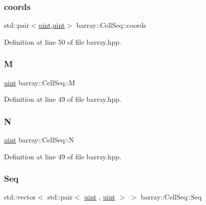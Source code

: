 \subsubsection{\texorpdfstring{coords}{coords}}
{\footnotesize\ttfamily std\+::pair$<$\hyperlink{namespacebarray_af9756a31953db233f80a9cfe1ef31c32}{uint},\hyperlink{namespacebarray_af9756a31953db233f80a9cfe1ef31c32}{uint}$>$ barray\+::\+Cell\+Seq\+::coords\hspace{0.3cm}{\ttfamily [protected]}}



Definition at line 50 of file barray.\+hpp.

\mbox{\label{classbarray_1_1_cell_seq_a4af3a2d3555d9fa5d73ba2b4d60f0806}} 
\subsubsection{\texorpdfstring{M}{M}}
{\footnotesize\ttfamily \hyperlink{namespacebarray_af9756a31953db233f80a9cfe1ef31c32}{uint} barray\+::\+Cell\+Seq\+::M\hspace{0.3cm}{\ttfamily [protected]}}



Definition at line 49 of file barray.\+hpp.

\mbox{\label{classbarray_1_1_cell_seq_a9f2198b5a2acdcac50395f93b04bc04c}} 
\subsubsection{\texorpdfstring{N}{N}}
{\footnotesize\ttfamily \hyperlink{namespacebarray_af9756a31953db233f80a9cfe1ef31c32}{uint} barray\+::\+Cell\+Seq\+::N\hspace{0.3cm}{\ttfamily [protected]}}



Definition at line 49 of file barray.\+hpp.

\mbox{\label{classbarray_1_1_cell_seq_aa026242c5a91b405fcc08915a31da236}} 
\subsubsection{\texorpdfstring{Seq}{Seq}}
{\footnotesize\ttfamily std\+::vector$<$ std\+::pair$<$ \hyperlink{namespacebarray_af9756a31953db233f80a9cfe1ef31c32}{uint} , \hyperlink{namespacebarray_af9756a31953db233f80a9cfe1ef31c32}{uint} $>$ $>$ barray\+::\+Cell\+Seq\+::\+Seq\hspace{0.3cm}{\ttfamily [protected]}}



